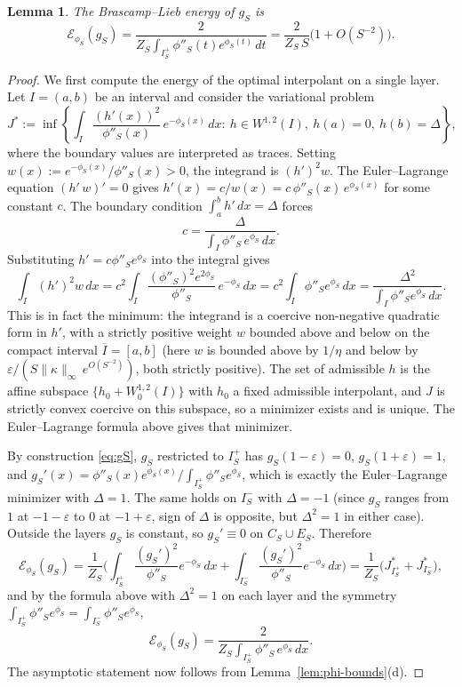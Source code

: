 \documentclass{article}
\newtheorem{lemma}[theorem]{Lemma}
\theoremstyle{remark}
\begin{document}
\begin{lemma}\label{lem:energy}
The Brascamp--Lieb energy of $g_S$ is
\[
  \mathcal E_{\phi_S}(g_S)
  =\frac{2}{Z_S\int_{I_S^+}\phi''_S(t)e^{\phi_S(t)}\,dt}
  =\frac{2}{Z_S\,S}\bigl(1+O(S^{-2})\bigr).
\]
\end{lemma}

\begin{proof}
We first compute the energy of the optimal interpolant on a single layer.
Let $I=(a,b)$ be an interval and consider the variational problem
\begin{equation}\label{eq:single-J}
  J^*:=\inf\left\{\int_I\frac{(h'(x))^2}{\phi''_S(x)}\,e^{-\phi_S(x)}\,dx
        :\ h\in W^{1,2}(I),\ h(a)=0,\ h(b)=\Delta\right\},
\end{equation}
where the boundary values are interpreted as traces. Setting
$w(x):=e^{-\phi_S(x)}/\phi''_S(x)>0$, the integrand is $(h')^2 w$.
The Euler--Lagrange equation $(h'\,w)'=0$ gives $h'(x)=c/w(x)
=c\,\phi''_S(x)\,e^{\phi_S(x)}$ for some constant $c$. The boundary condition
$\int_a^b h'\,dx=\Delta$ forces
\[
  c=\frac{\Delta}{\int_I\phi''_S\,e^{\phi_S}\,dx}.
\]
Substituting $h'=c\phi''_S e^{\phi_S}$ into the integral gives
\[
  \int_I (h')^2 w\,dx
  =c^2\int_I\frac{(\phi''_S)^2 e^{2\phi_S}}{\phi''_S}\,e^{-\phi_S}\,dx
  =c^2\int_I\phi''_S e^{\phi_S}\,dx
  =\frac{\Delta^2}{\int_I\phi''_S e^{\phi_S}\,dx}.
\]
This is in fact the minimum: the integrand is a coercive non-negative
quadratic form in $h'$, with a strictly positive weight $w$ bounded above
and below on the compact interval $\overline I=[a,b]$ (here $w$ is bounded
above by $1/\eta$ and below by $\varepsilon/(S\|\kappa\|_\infty\,e^{O(S^{-2})})$,
both strictly positive). The set of admissible $h$ is the affine subspace
$\{h_0+W_0^{1,2}(I)\}$ with $h_0$ a fixed admissible interpolant, and $J$ is
strictly convex coercive on this subspace, so a minimizer exists and is
unique. The Euler--Lagrange formula above gives that minimizer.

By construction \eqref{eq:gS}, $g_S$ restricted to $I_S^+$ has $g_S(1-\varepsilon)
=0$, $g_S(1+\varepsilon)=1$, and
$g_S'(x)=\phi''_S(x)e^{\phi_S(x)}\big/\int_{I_S^+}\phi''_S e^{\phi_S}$,
which is exactly the Euler--Lagrange minimizer with $\Delta=1$. The same holds
on $I_S^-$ with $\Delta=-1$ (since $g_S$ ranges from $1$ at $-1-\varepsilon$
to $0$ at $-1+\varepsilon$, sign of $\Delta$ is opposite, but $\Delta^2=1$ in
either case). Outside the layers $g_S$ is constant, so $g_S'\equiv 0$ on
$C_S\cup E_S$. Therefore
\[
  \mathcal E_{\phi_S}(g_S)
  =\frac{1}{Z_S}\Biggl(\int_{I_S^+}\frac{(g_S')^2}{\phi''_S}e^{-\phi_S}\,dx
                 +\int_{I_S^-}\frac{(g_S')^2}{\phi''_S}e^{-\phi_S}\,dx\Biggr)
  =\frac{1}{Z_S}\bigl(J^*_{I_S^+}+J^*_{I_S^-}\bigr),
\]
and by the formula above with $\Delta^2=1$ on each layer and the symmetry
$\int_{I_S^+}\phi''_S e^{\phi_S}=\int_{I_S^-}\phi''_S e^{\phi_S}$,
\[
  \mathcal E_{\phi_S}(g_S)
  =\frac{2}{Z_S\int_{I_S^+}\phi''_S\,e^{\phi_S}\,dx}.
\]
The asymptotic statement now follows from
Lemma~\ref{lem:phi-bounds}(d).
\end{proof}
\end{document}
